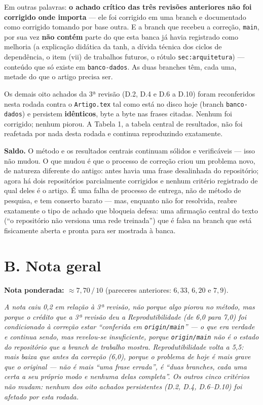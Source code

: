 \documentclass[11pt,a4paper]{article}
\begin{document}
Em outras palavras: \textbf{o achado crítico das três revisões anteriores não foi corrigido onde
importa} --- ele foi corrigido em uma branch e documentado como corrigido tomando por base outra. E a
branch que recebeu a correção, \texttt{main}, por sua vez \textbf{não contém} parte do que esta banca
já havia registrado como melhoria (a explicação didática da tanh, a dívida técnica dos ciclos de
dependência, o item (vii) de trabalhos futuros, o rótulo \texttt{sec:arquitetura}) --- conteúdo que
só existe em \texttt{banco-dados}. As duas branches têm, cada uma, metade do que o artigo precisa ser.

Os demais oito achados da 3ª revisão (D.2, D.4 e D.6 a D.10) foram reconferidos nesta rodada contra o
\texttt{Artigo.tex} tal como está no disco hoje (branch \texttt{banco-dados}) e persistem
\textbf{idênticos}, byte a byte nas frases citadas. Nenhum foi corrigido; nenhum piorou. A Tabela 1,
a tabela central de resultados, não foi reafetada por nada desta rodada e continua reproduzindo
exatamente.

\textbf{Saldo.} O método e os resultados centrais continuam sólidos e verificáveis --- isso não mudou.
O que mudou é que o processo de correção criou um problema novo, de natureza diferente do antigo:
antes havia uma frase desalinhada do repositório; agora há dois repositórios parcialmente corrigidos
e nenhum critério registrado de qual deles é o artigo. É uma falha de processo de entrega, não de
método de pesquisa, e tem conserto barato --- mas, enquanto não for resolvida, reabre exatamente o
tipo de achado que bloqueia defesa: uma afirmação central do texto (``o repositório não versiona uma
rede treinada'') que é falsa na branch que está fisicamente aberta e pronta para ser mostrada à banca.

\section*{B. Nota geral}

\textbf{Nota ponderada: $\approx 7{,}70\,/\,10$} \quad (pareceres anteriores: $6{,}33$, $6{,}20$ e
$7{,}9$).

\textit{A nota caiu 0,2 em relação à 3ª revisão, não porque algo piorou no método, mas porque o
crédito que a 3ª revisão deu a Reprodutibilidade (de 6,0 para 7,0) foi condicionado à correção estar
``conferida em \texttt{origin/main}'' --- o que era verdade e continua sendo, mas revelou-se
insuficiente, porque \texttt{origin/main} não é o estado do repositório que a branch de trabalho
mostra. Reprodutibilidade volta a 5,5: mais baixa que antes da correção (6,0), porque o problema de
hoje é mais grave que o original --- não é mais ``uma frase errada'', é ``duas branches, cada uma
certa a seu próprio modo e nenhuma delas completa''. Os outros cinco critérios não mudam: nenhum dos
oito achados persistentes (D.2, D.4, D.6--D.10) foi afetado por esta rodada.}
\end{document}
